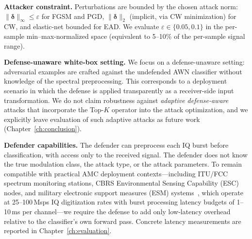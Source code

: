 \textbf{Attacker constraint.}
Perturbations are bounded by the chosen attack norm:
$\|\boldsymbol{\delta}\|_\infty \leq \varepsilon$ for FGSM and PGD,
$\|\boldsymbol{\delta}\|_2$ (implicit, via CW minimization) for CW, and
elastic-net bounded for EAD. We evaluate $\varepsilon \in \{0.05, 0.1\}$ in
the per-sample min--max-normalized space (equivalent to 5--10\% of the
per-sample signal range).

\textbf{Defense-unaware white-box setting.}
We focus on a defense-unaware setting: adversarial examples are crafted
against the undefended AWN classifier without knowledge of the spectral
preprocessing. This corresponds to a deployment scenario in which the
defense is applied transparently as a receiver-side input transformation.
We do not claim robustness against \emph{adaptive defense-aware} attacks
that incorporate the Top-$K$ operator into the attack optimization, and we
explicitly leave evaluation of such adaptive attacks as future work
(Chapter~\ref{ch:conclusion}).

\textbf{Defender capabilities.}
The defender can preprocess each IQ burst before classification, with access
only to the received signal. The defender does not know the true modulation
class, the attack type, or the attack parameters. To remain compatible with
practical AMC deployment contexts---including ITU/FCC spectrum monitoring
stations, CBRS Environmental Sensing Capability (ESC) nodes, and military
electronic support measures (ESM) systems~\cite{proakis2008digital}, which
operate at 25--100\,Msps IQ digitization rates with burst processing latency
budgets of 1--10\,ms per channel---we require the defense to add only
low-latency overhead relative to the classifier's own forward pass. Concrete
latency measurements are reported in Chapter~\ref{ch:evaluation}.
